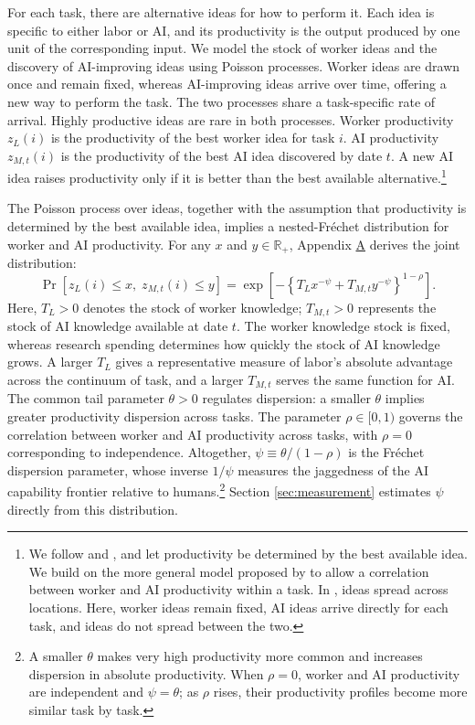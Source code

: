 \documentclass[11pt]{article}
\begin{document}
For each task, there are alternative ideas for how to perform it.
Each idea is specific to either labor or AI, and its productivity
is the output produced by one unit of the corresponding input. We
model the stock of worker ideas and the discovery of AI-improving
ideas using Poisson processes. Worker ideas are drawn once and remain
fixed, whereas AI-improving ideas arrive over time, offering a new
way to perform the task. The two processes share a task-specific rate
of arrival. Highly productive ideas are rare in both processes. Worker
productivity $z_{L}(i)$ is the productivity of the best worker idea
for task $i$. AI productivity $z_{M,t}(i)$ is the productivity of
the best AI idea discovered by date $t$. A new AI idea raises productivity
only if it is better than the best available alternative.\footnote{We follow \citet{kortum1997} and \citet{ek2001}, and let productivity
be determined by the best available idea. We build on the more general
model proposed by \citet{lri2023} to allow a correlation between
worker and AI productivity within a task. In \citet{lri2023}, ideas
spread across locations. Here, worker ideas remain fixed, AI ideas
arrive directly for each task, and ideas do not spread between the
two.}

The Poisson process over ideas, together with the assumption that
productivity is determined by the best available idea, implies a nested-Fréchet
distribution for worker and AI productivity. For any $x$ and $y\in\mathds{R}_{+}$,
Appendix \href{https://ahmadlp.github.io/Lashkaripour_AI_Displacement_Online_Appendix.pdf\#page=1}{A} derives the joint distribution:
\begin{equation}
\Pr\!\left[z_{L}(i)\leq x,\;z_{M,t}(i)\leq y\right]=\exp\!\left[-\left\{ T_{L}x^{-\psi}+T_{M,t}y^{-\psi}\right\} ^{1-\rho}\right].\label{eq:relative-productivity-cdf}
\end{equation}
Here, $T_{L}>0$ denotes the stock of worker knowledge; $T_{M,t}>0$
represents the stock of AI knowledge available at date $t$. The worker
knowledge stock is fixed, whereas research spending determines how
quickly the stock of AI knowledge grows. A larger $T_{L}$ gives a
representative measure of labor's absolute advantage across the continuum
of task, and a larger $T_{M,t}$ serves the same function for AI.
The common tail parameter $\theta>0$ regulates dispersion: a smaller
$\theta$ implies greater productivity dispersion across tasks. The
parameter $\rho\in[0,1)$ governs the correlation between worker and
AI productivity across tasks, with $\rho=0$ corresponding to independence.
Altogether, $\psi\equiv\theta/(1-\rho)$ is the Fréchet dispersion
parameter, whose inverse $1/\psi$ measures the jaggedness of the
AI capability frontier relative to humans.\footnote{A smaller $\theta$ makes very high productivity more common and increases
dispersion in absolute productivity. When $\rho=0$, worker and AI
productivity are independent and $\psi=\theta$; as $\rho$ rises,
their productivity profiles become more similar task by task.} Section \ref{sec:measurement} estimates $\psi$ directly from this
distribution.
\end{document}
